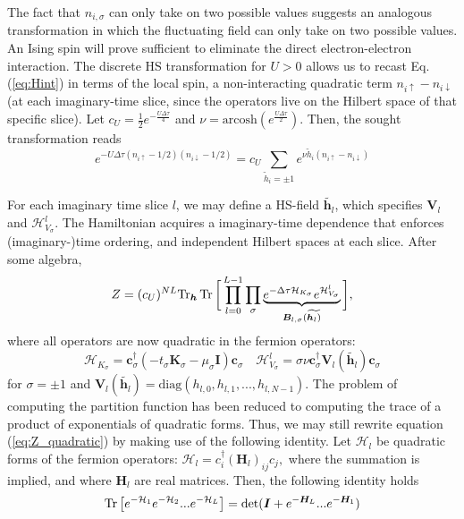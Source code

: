 The fact that $n_{i,\sigma}$ can only take on two possible values suggests an analogous transformation in which the fluctuating field can only take on two possible values.
An Ising spin will prove sufficient to eliminate the direct electron-electron interaction.
The discrete HS transformation for $U > 0$ allows us to recast Eq.(\ref{eq:Hint}) in terms of the local spin, a non-interacting quadratic term $n_{i\uparrow} - n_{i\downarrow} $ (at each imaginary-time slice, since the operators live on the Hilbert space of that specific slice).
Let $c_U = \frac{1}{2} e^{-\frac{U\Delta \tau}{4}}$ and $\nu = \text{arcosh} ( e^{\frac{U\Delta\tau}{2}})$.
Then, the sought transformation reads
\begin{equation}\label{eq:discreteHS}
e^{-U \Delta\tau (n_{i\uparrow} - 1/2 ) (n_{i\downarrow} - 1/2 )} = c_U \sum_{\widetilde{h}_i = \pm 1} e^{\nu \widetilde{h}_i (n_{i\uparrow} - n_{i\downarrow} )}
\end{equation}

For each imaginary time slice $l$, we may define a HS-field $\widetilde{\bm h_l}$, which specifies $\bm V_l$ and $\mathcal{H}_{V_\sigma}^l$.
The Hamiltonian acquires a  imaginary-time dependence that enforces (imaginary-)time ordering, and independent Hilbert spaces at each slice.
After some algebra,
\begin{equation}\label{eq:Z_quadratic}
Z  = (c_U)^{NL} \text{Tr}_{\bm h} \operatorname{Tr} \bigg[ \prod_{l=0}^{L-1} \prod_\sigma \underbrace{ e^{-\Delta\tau  \mathcal{H}_{K_\sigma}} e^{\mathcal{H}_{V_\sigma}^l}}_{\bm B_{l, \sigma}(\widetilde{\bm h_l)}} \bigg] ,
\end{equation}
where all operators are now quadratic in the fermion operators:
\begin{equation}
\mathcal{H}_{K_\sigma} = \bm c_\sigma^\dagger ( - t_\sigma \bm K_\sigma -\mu_\sigma \bm I ) \bm c_\sigma \quad \mathcal{H}_{V_\sigma}^l = \sigma \nu \bm c_\sigma^\dagger \bm V_l (\widetilde{\bm h_l}) \bm c_\sigma
\end{equation}
for $\sigma = \pm 1$ and $\bm V_l ( \widetilde{\bm h_l} ) = \text{diag} ( h_{l, 0} , h_{l, 1}, ... , h_{l, N-1} )$.
The problem of computing the partition function has been reduced to computing the trace of a product of exponentials of quadratic forms.
Thus, we may still rewrite equation (\ref{eq:Z_quadratic}) by making use of the following identity.
Let $\mathcal{H}_l$ be quadratic forms of the fermion operators: 
$
\mathcal{H}_l = c_i^\dagger (\bm H_l)_{ij} c_j,
$
 where the summation is implied, and where $\bm H_l$ are real matrices.
Then, the following identity holds
\begin{equation}\label{eq:quadraticIdentity}
\operatorname{Tr} \big[ e^{-\mathcal{H}_1 } e^{-\mathcal{H}_2 } ... e^{-\mathcal{H}_L } \big] = \text{det} ( \bm I + e^{-\bm H_L} ... e^{-\bm H_1} )
\end{equation}

